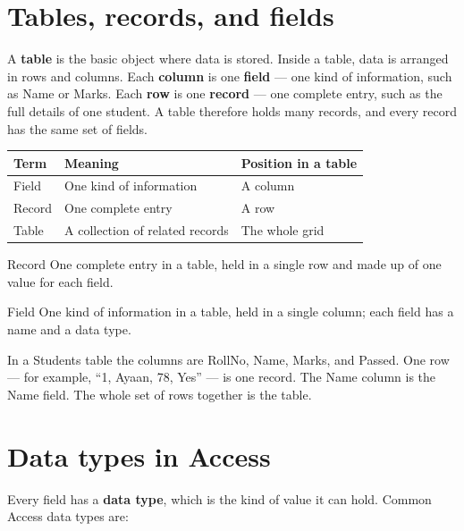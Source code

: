 \section{Tables, records, and fields}
A \textbf{table} is the basic object where data is stored. Inside a table,
data is arranged in rows and columns. Each \textbf{column} is one
\textbf{field} --- one kind of information, such as Name or Marks. Each
\textbf{row} is one \textbf{record} --- one complete entry, such as the full
details of one student. A table therefore holds many records, and every
record has the same set of fields.

\begin{center}
\begin{tabular}{p{}p{}p{}}
\toprule
\textbf{Term} & \textbf{Meaning} & \textbf{Position in a table} \\
\midrule
Field & One kind of information & A column \\
Record & One complete entry & A row \\
Table & A collection of related records & The whole grid \\
\bottomrule
\end{tabular}
\end{center}

\begin{definitionbox}{Record}
One complete entry in a table, held in a single row and made up of one value
for each field.
\end{definitionbox}

\begin{definitionbox}{Field}
One kind of information in a table, held in a single column; each field has a
name and a data type.
\end{definitionbox}

\begin{example}
In a Students table the columns are RollNo, Name, Marks, and Passed. One row
--- for example, ``1, Ayaan, 78, Yes'' --- is one record. The Name column is
the Name field. The whole set of rows together is the table.
\end{example}

\section{Data types in Access}
Every field has a \textbf{data type}, which is the kind of value it can hold.
Common Access data types are:

